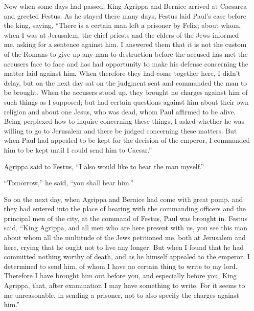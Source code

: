 Now when some days had passed, King Agrippa and Bernice
arrived at Caesarea and greeted Festus.  As he stayed
there many days, Festus laid Paul's case before the king, saying,
``There is a certain man left a prisoner by Felix;  about
whom, when I was at Jerusalem, the chief priests and the elders of the
Jews informed me, asking for a sentence against him.  I
answered them that it is not the custom of the Romans to give up any man
to destruction before the accused has met the accusers face to face and
has had opportunity to make his defense concerning the matter laid
against him.  When therefore they had come together here,
I didn't delay, but on the next day sat on the judgment seat and
commanded the man to be brought.  When the accusers stood
up, they brought no charges against him of such things as I supposed;
 but had certain questions against him about their own
religion and about one Jesus, who was dead, whom Paul affirmed to be
alive.  Being perplexed how to inquire concerning these
things, I asked whether he was willing to go to Jerusalem and there be
judged concerning these matters.  But when Paul had
appealed to be kept for the decision of the emperor, I commanded him to
be kept until I could send him to Caesar.''

 Agrippa said to Festus, ``I also would like to hear the
man myself.''

``Tomorrow,'' he said, ``you shall hear him.''

 So on the next day, when Agrippa and Bernice had come
with great pomp, and they had entered into the place of hearing with the
commanding officers and the principal men of the city, at the command of
Festus, Paul was brought in.  Festus said, ``King
Agrippa, and all men who are here present with us, you see this man
about whom all the multitude of the Jews petitioned me, both at
Jerusalem and here, crying that he ought not to live any longer.
 But when I found that he had committed nothing worthy of
death, and as he himself appealed to the emperor, I determined to send
him,  of whom I have no certain thing to write to my
lord. Therefore I have brought him out before you, and especially before
you, King Agrippa, that, after examination I may have something to
write.  For it seems to me unreasonable, in sending a
prisoner, not to also specify the charges against him.''

